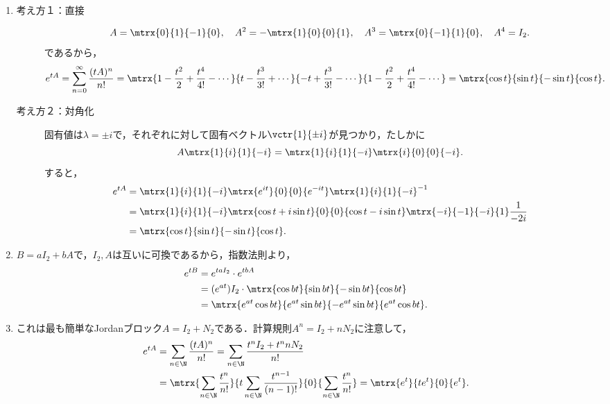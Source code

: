 \documentclass[uplatex,dvipdfmx]{jsreport}
\begin{document}
\begin{Proof}\mbox{}
    \begin{enumerate}
        \item 
        \begin{description}
            \item[考え方１：直接] \[A=\mtrx{0}{1}{-1}{0},\quad A^2=-\mtrx{1}{0}{0}{1},\quad A^3=\mtrx{0}{-1}{1}{0},\quad A^4=I_2.\]
            であるから，
            \[e^{tA}=\sum_{n=0}^\infty\frac{(tA)^n}{n!}=\mtrx{1-\frac{t^2}{2}+\frac{t^4}{4!}-\cdots}{t-\frac{t^3}{3!}+\cdots}{-t+\frac{t^3}{3!}-\cdots}{1-\frac{t^2}{2}+\frac{t^4}{4!}-\cdots}=\mtrx{\cos t}{\sin t}{-\sin t}{\cos t}.\]
            \item[考え方２：対角化] 固有値は$\lambda=\pm i$で，それぞれに対して固有ベクトル$\vctr{1}{\pm i}$が見つかり，たしかに
            \[A\mtrx{1}{i}{1}{-i}=\mtrx{1}{i}{1}{-i}\mtrx{i}{0}{0}{-i}.\]
            すると，
            \begin{align*}
                e^{tA}&=\mtrx{1}{i}{1}{-i}\mtrx{e^{it}}{0}{0}{e^{-it}}\mtrx{1}{i}{1}{-i}^{-1}\\
                &=\mtrx{1}{i}{1}{-i}\mtrx{\cos t+i\sin t}{0}{0}{\cos t-i\sin t}\mtrx{-i}{-1}{-i}{1}\frac{1}{-2i}\\
                &=\mtrx{\cos t}{\sin t}{-\sin t}{\cos t}.
            \end{align*}
            \end{description}
        \item $B=aI_2+bA$で，$I_2,A$は互いに可換であるから，指数法則より，
        \begin{align*}
            e^{tB}&=e^{taI_2}\cdot e^{tbA}\\
            &=(e^{at})I_2\cdot \mtrx{\cos bt}{\sin bt}{-\sin bt}{\cos bt}\\
            &=\mtrx{e^{at}\cos bt}{e^{at}\sin bt}{-e^{at}\sin bt}{e^{at}\cos bt}.
        \end{align*}
        \item これは最も簡単なJordanブロック$A=I_2+N_2$である．計算規則$A^n=I_2+nN_2$に注意して，
        \begin{align*}
            e^{tA}&=\sum_{n\in\N}\frac{(tA)^n}{n!}=\sum_{n\in\N}\frac{t^nI_2+t^nnN_2}{n!}\\
            &=\mtrx{\sum_{n\in\N}\frac{t^n}{n!}}{t\sum_{n\in\N}\frac{t^{n-1}}{(n-1)!}}{0}{\sum_{n\in\N}\frac{t^n}{n!}}=\mtrx{e^t}{te^t}{0}{e^t}.
        \end{align*}
    \end{enumerate}
\end{Proof}
\end{document}
